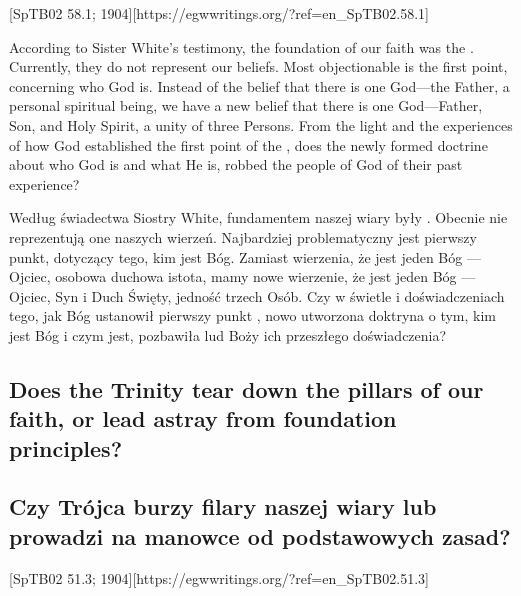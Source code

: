 [SpTB02 58.1; 1904][https://egwwritings.org/?ref=en\_SpTB02.58.1]


According to Sister White’s testimony, the foundation of our faith was the . Currently, they do not represent our beliefs. Most objectionable is the first point, concerning who God is. Instead of the belief that there is one God—the Father, a personal spiritual being, we have a new belief that there is one God—Father, Son, and Holy Spirit, a unity of three Persons. From the light and the experiences of how God established the first point of the , does the newly formed doctrine about who God is and what He is, robbed the people of God of their past experience?


Według świadectwa Siostry White, fundamentem naszej wiary były . Obecnie nie reprezentują one naszych wierzeń. Najbardziej problematyczny jest pierwszy punkt, dotyczący tego, kim jest Bóg. Zamiast wierzenia, że jest jeden Bóg — Ojciec, osobowa duchowa istota, mamy nowe wierzenie, że jest jeden Bóg — Ojciec, Syn i Duch Święty, jedność trzech Osób. Czy w świetle i doświadczeniach tego, jak Bóg ustanowił pierwszy punkt , nowo utworzona doktryna o tym, kim jest Bóg i czym jest, pozbawiła lud Boży ich przeszłego doświadczenia?


\subsection*{Does the Trinity tear down the pillars of our faith, or lead astray from foundation principles?}


\subsection*{Czy Trójca burzy filary naszej wiary lub prowadzi na manowce od podstawowych zasad?}


[SpTB02 51.3; 1904][https://egwwritings.org/?ref=en\_SpTB02.51.3]


